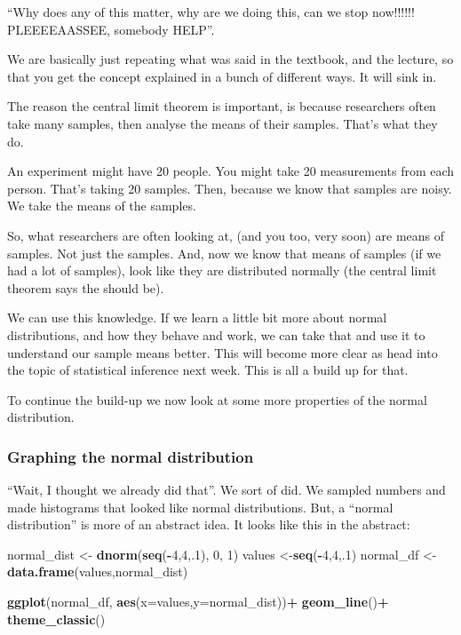 \documentclass[]{book}
\newenvironment{Shaded}{\begin{snugshade}}{\end{snugshade}}
\newcommand{\KeywordTok}[1]{\textcolor[rgb]{0.13,0.29,0.53}{\textbf{#1}}}
\newcommand{\DataTypeTok}[1]{\textcolor[rgb]{0.13,0.29,0.53}{#1}}
\newcommand{\DecValTok}[1]{\textcolor[rgb]{0.00,0.00,0.81}{#1}}
\newcommand{\StringTok}[1]{\textcolor[rgb]{0.31,0.60,0.02}{#1}}
\newcommand{\OperatorTok}[1]{\textcolor[rgb]{0.81,0.36,0.00}{\textbf{#1}}}
\newcommand{\NormalTok}[1]{#1}
\begin{document}
``Why does any of this matter, why are we doing this, can we stop
now!!!!!! PLEEEEAASSEE, somebody HELP''.

We are basically just repeating what was said in the textbook, and the
lecture, so that you get the concept explained in a bunch of different
ways. It will sink in.

The reason the central limit theorem is important, is because
researchers often take many samples, then analyse the means of their
samples. That's what they do.

An experiment might have 20 people. You might take 20 measurements from
each person. That's taking 20 samples. Then, because we know that
samples are noisy. We take the means of the samples.

So, what researchers are often looking at, (and you too, very soon) are
means of samples. Not just the samples. And, now we know that means of
samples (if we had a lot of samples), look like they are distributed
normally (the central limit theorem says the should be).

We can use this knowledge. If we learn a little bit more about normal
distributions, and how they behave and work, we can take that and use it
to understand our sample means better. This will become more clear as
head into the topic of statistical inference next week. This is all a
build up for that.

To continue the build-up we now look at some more properties of the
normal distribution.

\subsubsection{Graphing the normal
distribution}\label{graphing-the-normal-distribution}

``Wait, I thought we already did that''. We sort of did. We sampled
numbers and made histograms that looked like normal distributions. But,
a ``normal distribution'' is more of an abstract idea. It looks like
this in the abstract:

\begin{Shaded}
\begin{Highlighting}[]
\NormalTok{normal_dist <-}\StringTok{ }\KeywordTok{dnorm}\NormalTok{(}\KeywordTok{seq}\NormalTok{(}\OperatorTok{-}\DecValTok{4}\NormalTok{,}\DecValTok{4}\NormalTok{,.}\DecValTok{1}\NormalTok{), }\DecValTok{0}\NormalTok{, }\DecValTok{1}\NormalTok{)}
\NormalTok{values <-}\KeywordTok{seq}\NormalTok{(}\OperatorTok{-}\DecValTok{4}\NormalTok{,}\DecValTok{4}\NormalTok{,.}\DecValTok{1}\NormalTok{)}
\NormalTok{normal_df <-}\KeywordTok{data.frame}\NormalTok{(values,normal_dist)}

\KeywordTok{ggplot}\NormalTok{(normal_df, }\KeywordTok{aes}\NormalTok{(}\DataTypeTok{x=}\NormalTok{values,}\DataTypeTok{y=}\NormalTok{normal_dist))}\OperatorTok{+}
\StringTok{  }\KeywordTok{geom_line}\NormalTok{()}\OperatorTok{+}
\StringTok{  }\KeywordTok{theme_classic}\NormalTok{()}
\end{Highlighting}
\end{Shaded}
\end{document}
